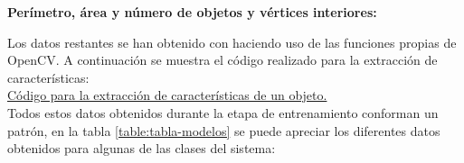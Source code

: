 


\textbf{Perímetro, área y número de objetos y vértices interiores:}

Los datos restantes se han obtenido con haciendo uso de las funciones propias de OpenCV. A continuación se muestra el código realizado para la extracción de características:\\

\underline{Código para la extracción de características de un objeto.}\\


Todos estos datos obtenidos durante la etapa de entrenamiento conforman un patrón, en la tabla \ref{table:tabla-modelos} se puede apreciar los diferentes datos obtenidos para algunas de las clases del sistema:\\

